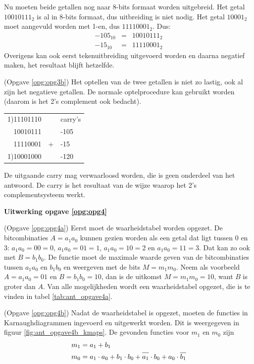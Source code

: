 \documentclass[a4paper,12pt,addpoints,fleqn,dutch,concept]{tisdexam}
\newcommand*{\oline}[1]{\overline{#1\mathstrut}}
\begin{document}
\begin{questions}
Nu moeten beide getallen nog naar 8-bits formaat worden uitgebreid. Het getal
$10010111_{2}$ is al in 8-bits formaat, dus uitbreiding is niet nodig. Het
getal $10001_{2}$ moet aangevuld worden met 1-en, dus $11110001_{2}$. Dus:
\begin{eqnarray}
\nonumber -105_{10} & = & 10010111_{2} \\
\nonumber -15_{10}  & = & 11110001_{2}
\end{eqnarray}
Overigens kan ook eerst tekenuitbreiding uitgevoerd worden en daarna
negatief maken, het resultaat blijft hetzelfde.

(Opgave \ref{opg:opg3b}) Het optellen van de twee getallen is niet zo lastig,
ook al zijn het negatieve getallen. De normale optelprocedure kan gebruikt
worden (daarom is het 2's complement ook bedacht).

\begin{table}[H]
  \begin{tabular}{ r c l }
   1)11101110 &   & carry's     \\
     10010111 &   & -105        \\
     11110001 & + & -15         \\  \cline{1-1}
   1)10001000 &   & -120    
  \end{tabular}
\end{table}

De uitgaande carry mag verwaarloosd worden, die is geen onderdeel van het antwoord.
De carry is het resultaat van de wijze waarop het 2's complementsysteem werkt.


\vspace{1em}

\textbf{Uitwerking opgave \ref{opg:opg4}}

(Opgave \ref{opg:opg4a}) Eerst moet de waarheidstabel worden opgezet. De
bitcombinaties $A = a_{1}a_{0}$ kunnen gezien worden als een
getal dat ligt tussen 0 en 3: $a_{1}a_{0} = 00 = 0$, $a_{1}a_{0} = 01 = 1$,
$a_{1}a_{0} = 10 = 2$ en $a_{1}a_{0} = 11 = 3$. Dat kan zo ook met
$B = b_{1}b_{0}$. De functie moet de maximale waarde geven van de bitcombinaties
tussen $a_{1}a_{0}$ en $b_{1}b_{0}$ en weergeven met de bits $M = m_{1}m_{0}$.
Neem als voorbeeld $A = a_{1}a_{0} = 01$ en $B = b_{1}b_{0} = 10$, dan is de uitkomst
$M = m_{1}m_{0} = 10$, want $B$ is groter dan $A$. Van alle mogelijkheden
wordt een waarheidstabel opgezet, die is te vinden in tabel \ref{tab:ant_opgave4a}.

(Opgave \ref{opg:opg4b}) Nadat de waarheidstabel is opgezet, moeten de functies
in Karnaughdiagrammen ingevoerd en uitgewerkt worden. Dit is weergegeven in
figuur \ref{fig:ant_opgave4b_kmaps}. De gevonden functies voor $m_{1}$ en $m_{0}$
zijn
\begin{equation*}
\begin{split}
m_{1} & = a_{1} + b_{1} \\
m_{0} & = a_{1} \cdot a_{0} + b_{1} \cdot b_{0} + \oline{a_{1}} \cdot b_{0} + a_{0} \cdot \oline{b_{1}}
\end{split}
\end{equation*}


\end{questions}
\end{document}
